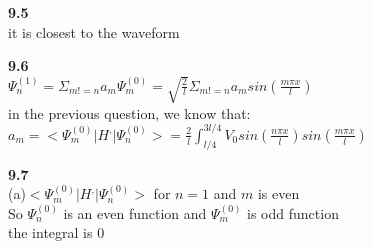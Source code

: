 \documentclass{article}
\begin{document}
\textbf{9.5}\\
it is closest to the waveform\\
\newline

\textbf{9.6}\\
$\Psi_n^{(1)} = \Sigma_{m!=n}a_m\Psi_m^{(0)} = \sqrt{\frac{2}{l}}\Sigma_{m!=n}a_m sin(\frac{m\pi x}{l})$\\
in the previous question, we know that:\\
$a_m = <\Psi_m^{(0)}|H^,|\Psi_n^{(0)}>=\frac{2}{l}\int_{l/4}^{3l/4}V_0sin(\frac{n\pi x}{l})sin(\frac{m\pi x}{l})$\\
\newline

\textbf{9.7}\\
(a)$<\Psi_m^{(0)}|H^,|\Psi_n^{(0)}>$ for $n = 1$ and $m$ is even\\
So $\Psi_n^{(0)}$ is an even function and $\Psi_m^{(0)}$ is odd function\\
the integral is 0\\
\newline
\end{document}

